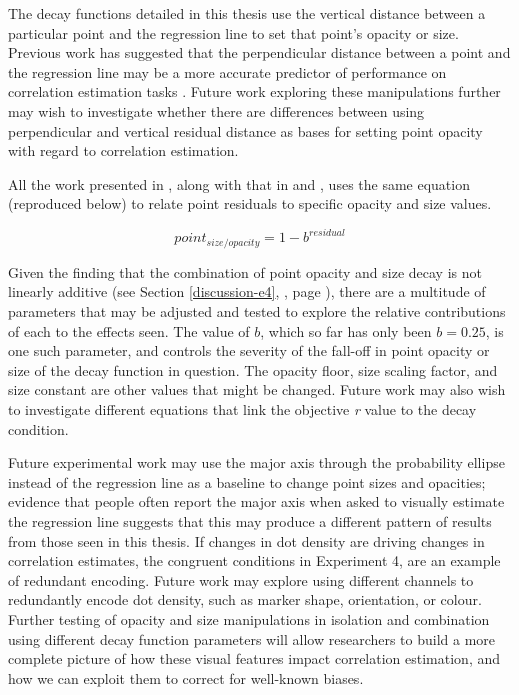 \documentclass[../main.tex]{subfiles}
\begin{document}
The decay functions detailed in this thesis use the vertical distance
between a particular point and the regression line to set that point's
opacity or size. Previous work \cite{meyer_1997} has suggested that the
perpendicular distance between a point and the regression line may be a
more accurate predictor of performance on correlation estimation tasks
\cite{cleveland_1982, rensink_2017, yang_2019}. Future work exploring
these manipulations further may wish to investigate whether there are
differences between using perpendicular and vertical residual distance
as bases for setting point opacity with regard to correlation
estimation.

All the work presented in , along
with that in  and
, uses the same equation (reproduced below) to
relate point residuals to specific opacity and size values.

\begin{equation}
point_{size/opacity} = 1 - b^{residual}
\end{equation}

Given the finding that the combination of point opacity and size decay
is not linearly additive (see Section \ref{discussion-e4},
, page \pageref{discussion-e4}),
there are a multitude of parameters that may be adjusted and tested to
explore the relative contributions of each to the effects seen. The
value of \(b\), which so far has only been \(b = 0.25\), is one such
parameter, and controls the severity of the fall-off in point opacity or
size of the decay function in question. The opacity floor, size scaling
factor, and size constant are other values that might be changed. Future
work may also wish to investigate different equations that link the
objective \emph{r} value to the decay condition.

Future experimental work may use the major axis through the probability
ellipse instead of the regression line as a baseline to change point
sizes and opacities; evidence that people often report the major axis
when asked to visually estimate the regression line \cite{collyer_1990}
suggests that this may produce a different pattern of results from those
seen in this thesis. If changes in dot density are driving changes in
correlation estimates, the congruent conditions in Experiment 4,
 are an example of redundant
encoding. Future work may explore using different channels to
redundantly encode dot density, such as marker shape, orientation, or
colour. Further testing of opacity and size manipulations in isolation
and combination using different decay function parameters will allow
researchers to build a more complete picture of how these visual
features impact correlation estimation, and how we can exploit them to
correct for well-known biases.
\end{document}
